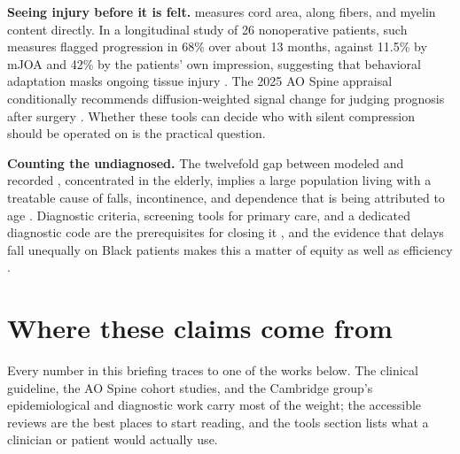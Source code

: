 \documentclass[11pt, letterpaper]{article}
\begin{document}
\textbf{Seeing injury before it is felt.}  measures cord area,  along fibers, and myelin content directly. In a longitudinal study of 26 nonoperative patients, such measures flagged progression in 68\% over about 13 months, against 11.5\% by mJOA and 42\% by the patients' own impression, suggesting that behavioral adaptation masks ongoing tissue injury \citep{martin2018}. The 2025 AO Spine appraisal conditionally recommends diffusion-weighted signal change for judging prognosis after surgery \citep{fehlings2025}. Whether these tools can decide who with silent compression should be operated on is the practical question.

\textbf{Counting the undiagnosed.} The twelvefold gap between modeled and recorded , concentrated in the elderly, implies a large population living with a treatable cause of falls, incontinence, and dependence that is being attributed to age \citep{grodzinski2023}. Diagnostic criteria, screening tools for primary care, and a dedicated diagnostic code are the prerequisites for closing it \citep{hilton2022,nouri2015}, and the evidence that delays fall unequally on Black patients makes this a matter of equity as well as efficiency \citep{pope2020delays}.

\section{Where these claims come from}

Every number in this briefing traces to one of the works below. The clinical guideline, the AO Spine cohort studies, and the Cambridge group's epidemiological and diagnostic work carry most of the weight; the accessible reviews are the best places to start reading, and the tools section lists what a clinician or patient would actually use.
\end{document}
